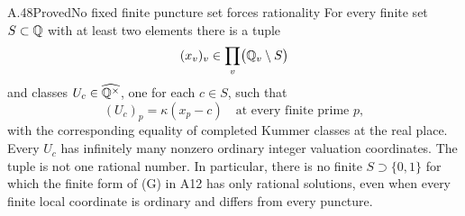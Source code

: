 \begin{statement}{A.48}{Proved}{No fixed finite puncture set forces rationality}
For every finite set $S\subset\mathbb Q$ with at least two
elements there is a tuple
\[
 (x_v)_v\in
 \prod_v\bigl(\mathbb Q_v\setminus S\bigr)
\]
and classes $U_c\in\widehat{\mathbb Q^\times}$, one for
each $c\in S$, such that
\[
       (U_c)_p=\kappa(x_p-c)
       \quad\text{at every finite prime }p,
 \tag{A.48.1}
\]
with the corresponding equality of completed Kummer
classes at the real place. Every $U_c$ has infinitely
many nonzero ordinary integer valuation coordinates.
The tuple is not one rational number. In particular,
there is no finite $S\supset\{0,1\}$ for which the
finite form of (G) in A12 has only rational solutions,
even when every finite local coordinate is ordinary
and differs from every puncture.
\end{statement}
